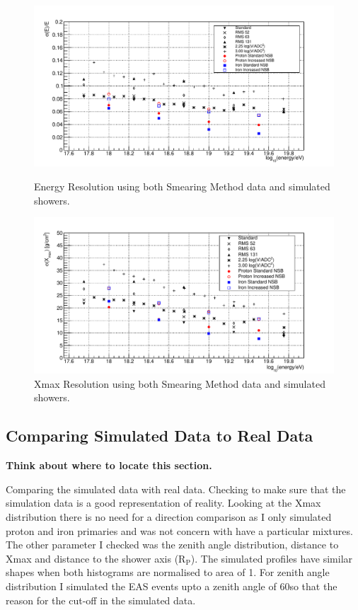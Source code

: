 \begin{figure}
\centering
\includegraphics[width=\textwidth]{chapters/graphs/SelectionEff/Combined_EnergyRes_All.pdf}
\caption{Energy Resolution using both Smearing Method data and simulated showers.}
\vspace{3mm}
\includegraphics[width=\textwidth]{chapters/graphs/SelectionEff/Combined_XmaxRes_All.pdf}
\caption{Xmax Resolution using both Smearing Method data and simulated showers.}
\end{figure}

\subsection{Comparing Simulated Data to Real Data}

\textbf{Think about where to locate this section.}

Comparing the simulated data with real data. Checking to make sure that the simulation data is a good representation of reality. Looking at the Xmax distribution there is no need for a direction comparison as I only simulated proton and iron primaries and was not concern with have a particular mixtures. The other parameter I checked was the zenith angle distribution, distance to Xmax and distance to the shower axis (R$_{\mathrm{P}}$). The simulated profiles have similar shapes when both histograms are normalised to area of 1. For zenith angle distribution I simulated the EAS events upto a zenith angle of 60\textdegree so that the reason for the cut-off in the simulated data.


